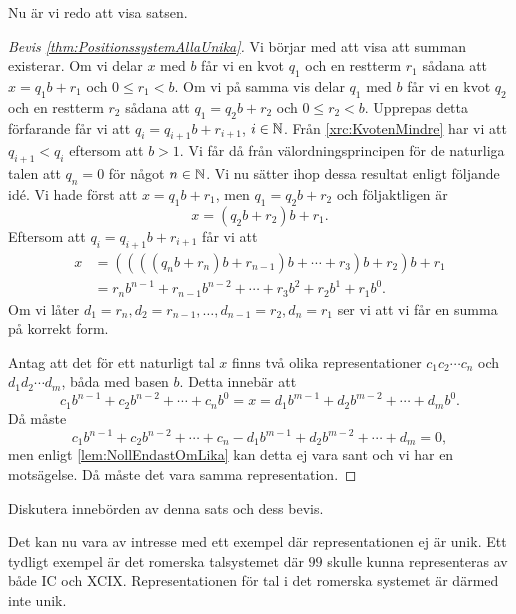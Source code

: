 Nu är vi redo att visa satsen.
\begin{proof}[Bevis \cref{thm:PositionssystemAllaUnika}]
  Vi börjar med att visa att summan existerar.
  Om vi delar \(x\) med \(b\) får vi en kvot \(q_1\) och en restterm
  \(r_1\) sådana att \(x=q_1b+r_1\) och \(0\leq r_1<b\).
  Om vi på samma vis delar \(q_1\) med \(b\) får vi en kvot \(q_2\) och en
  restterm \(r_2\) sådana att \(q_1=q_2b+r_2\) och \(0\leq r_2 < b\).
  Upprepas detta förfarande får vi att \(q_i=q_{i+1}b+r_{i+1}\), \(i\in\mathbb{N}\).
  Från \cref{xrc:KvotenMindre} har vi att \(q_{i+1}<q_i\) eftersom att
  \(b>1\).
  Vi får då från välordningsprincipen för de naturliga talen att \(q_n=0\)
  för något \(n\in\mathbb{N}\).
  Vi nu sätter ihop dessa resultat enligt följande idé.
  Vi hade först att \(x=q_1b+r_1\), men \(q_1=q_2b+r_2\) och följaktligen är
  \[x=(q_2b+r_2)b+r_1.\]
  Eftersom att \(q_i=q_{i+1}b+r_{i+1}\) får vi att
  \begin{align*}
    x &= ((((q_n b + r_n) b + r_{n-1}) b + \cdots + r_3) b + r_2) b + r_1 \\
     &= r_n b^{n-1} + r_{n-1} b^{n-2} + \cdots + r_3 b^2 + r_2 b^1 + r_1 b^0.
  \end{align*}
  Om vi låter \(d_1=r_n, d_2=r_{n-1}, \ldots, d_{n-1}=r_2, d_n=r_1\) ser vi
  att vi får en summa på korrekt form.

  Antag att det för ett naturligt tal \(x\) finns två olika representationer
  \(c_1c_2\cdots c_n\) och \(d_1d_2\cdots d_m\), båda med basen \(b\).
  Detta innebär att
  \begin{equation*}
    c_1 b^{n-1} + c_2 b^{n-2} + \cdots + c_n b^0 =
    x =
    d_1 b^{m-1} + d_2 b^{m-2} + \cdots + d_m b^0.
  \end{equation*}
  Då måste
  \begin{equation*}
    c_1b^{n-1}+c_2b^{n-2}+\cdots+c_n - d_1b^{m-1}+d_2b^{m-2}+\cdots+d_m =
    0,
  \end{equation*}
  men enligt \cref{lem:NollEndastOmLika} kan detta ej vara sant och vi har
  en motsägelse.
  Då måste det vara samma representation.
\end{proof}

\begin{exercise}
  Diskutera innebörden av denna sats och dess bevis.
\end{exercise}

\begin{example}
  Det kan nu vara av intresse med ett exempel där representationen ej är unik.
  Ett tydligt exempel är det romerska talsystemet där \(99\) skulle kunna
  representeras av både IC och XCIX.\@
  Representationen för tal i det romerska systemet är därmed inte unik.
\end{example}

